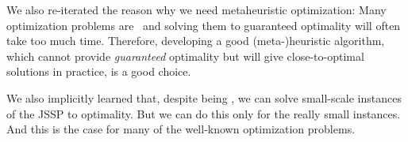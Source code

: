 We also re-iterated the reason why we need metaheuristic optimization:
Many optimization problems are \NPhard\ and solving them to guaranteed optimality will often take too much time.
Therefore, developing a good (meta-)heuristic algorithm, which cannot provide \emph{guaranteed} optimality but will give close-to-optimal solutions in practice, is a good choice.

We also implicitly learned that, despite being \NPhard, we can solve small-scale instances of the \gls{JSSP} to optimality.
But we can do this only for the really small instances.
And this is the case for many of the well-known optimization problems.%
\endhsection%
\endhsection%
%
